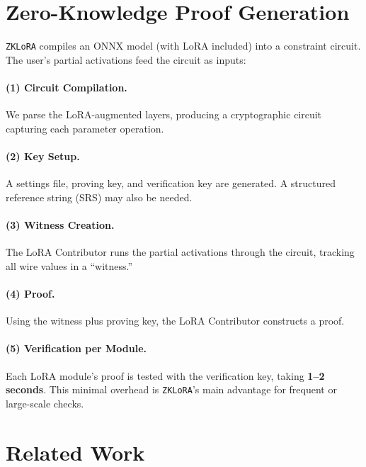 \documentclass[11pt]{article}
\begin{document}
\section{Zero-Knowledge Proof Generation}

\texttt{ZKLoRA} compiles an ONNX model (with LoRA included) into a constraint circuit. The user’s partial activations feed the circuit as inputs:

\paragraph{(1) Circuit Compilation.} 
We parse the LoRA-augmented layers, producing a cryptographic circuit capturing each parameter operation. 

\paragraph{(2) Key Setup.} 
A settings file, proving key, and verification key are generated. A structured reference string (SRS) may also be needed.

\paragraph{(3) Witness Creation.}
The LoRA Contributor runs the partial activations through the circuit, tracking all wire values in a “witness.” 

\paragraph{(4) Proof.}
Using the witness plus proving key, the LoRA Contributor constructs a proof. 

\paragraph{(5) Verification per Module.}
Each LoRA module’s proof is tested with the verification key, taking \textbf{1--2 seconds}. This minimal overhead is \texttt{ZKLoRA}’s main advantage for frequent or large-scale checks.

\section{Related Work}
\end{document}
